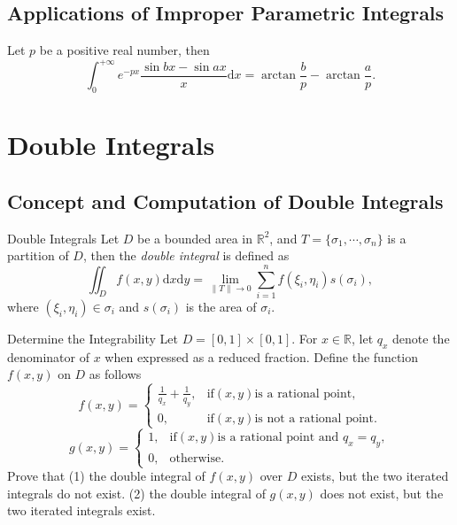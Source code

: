 \subsection{Applications of Improper Parametric Integrals}

\begin{proposition}{}{}
  Let $p$ be a positive real number, then
  \begin{equation}
    \int_0^{+\infty} e^{-px} \frac{\sin bx - \sin ax}{x} \mathrm{d} x
    = \arctan \frac{b}{p} - \arctan \frac{a}{p}.
  \end{equation}
\end{proposition}

\section{Double Integrals}

\subsection{Concept and Computation of Double Integrals}

\begin{definition}{Double Integrals}{}
  Let $D$ be a bounded area in $\mathbb{R}^2$,
  and $T = \{\sigma_1,\cdots,\sigma_n\}$ is a partition of $D$,
  then the \emph{double integral} is defined as
  \begin{equation}
    \iint_D f(x,y)\mathrm{d}x \mathrm{d}y = \lim \limits _{\|T\|\rightarrow 0} \sum\limits_{i = 1}^n f(\xi_i, \eta_i) s(\sigma_i),
  \end{equation}
  where $(\xi_i, \eta_i) \in \sigma_i$ and $s(\sigma_i)$ is the area of $\sigma_i$.
\end{definition}

\begin{example}{Determine the Integrability}{}
  Let $D = [0, 1]\times [0,1]$. For $x \in \mathbb{R}$,
  let $q_x$ denote the denominator of $x$ when expressed as a reduced fraction.
  Define the function $f(x,y)$ on $D$ as follows
  \begin{equation}
    f(x,y)=\begin{cases}
      \frac{1}{q_x}+\frac{1}{q_y},&\mathrm{if}\left(x,y\right)\text{is a rational point},\\
      0,&\mathrm{if}\left(x,y\right)\text{is not a rational point}.
    \end{cases}
  \end{equation}
  \begin{equation}
    g(x,y)=\begin{cases}
      1,&\mathrm{if}(x,y)\text{is a rational point and }q_x=q_y,\\
      0,&\text{otherwise.}
    \end{cases}
  \end{equation}
  Prove that (1) the double integral of $f(x,y)$ over $D$ exists, but the two
  iterated integrals do not exist.
  (2) the double integral of $g(x,y)$ does not exist, but the two iterated
  integrals exist.
\end{example}


